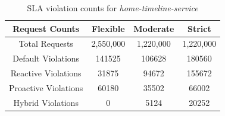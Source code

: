 \begin{table}
    \caption{SLA violation counts for \textit{home-timeline-service}}\label{tab:exp1-sla-violation-count}
    \centering
    \begin{tabular}{cccc}
        \toprule
        \textbf{Request Counts} & \textbf{Flexible} & \textbf{Moderate} & \textbf{Strict} \\
        \midrule
        Total Requests  & 2,550,000 & 1,220,000 & 1,220,000\\
        \midrule
        Default Violations & \num[group-separator={,}]{141525} & \num[group-separator={,}]{106628} & \num[group-separator={,}]{180560} \\
        Reactive Violations & \num[group-separator={,}]{31875} & \num[group-separator={,}]{94672} & \num[group-separator={,}]{155672} \\
        Proactive Violations & \num[group-separator={,}]{60180} & \num[group-separator={,}]{35502} & \num[group-separator={,}]{66002} \\
        Hybrid Violations & \num[group-separator={,}]{0} & \num[group-separator={,}]{5124} & \num[group-separator={,}]{20252} \\
        \toprule
    \end{tabular}
\end{table}

